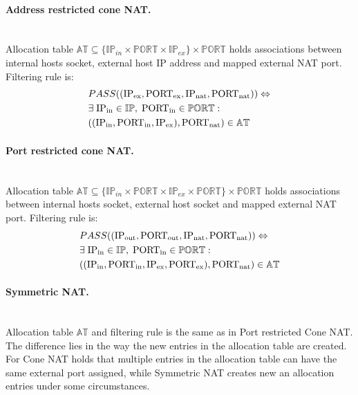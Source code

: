 \documentclass[twoside]{article}
\begin{document}
\begin{multicols}{2}
\paragraph{Address restricted cone NAT.} ~\\
Allocation table $\mathbb{AT} \subseteq \{\mathbb{IP}_{in} \times \mathbb{PORT} \times \mathbb{IP}_{ex}\} \times \mathbb{PORT}$ 
holds associations between internal hosts socket, external host IP address and mapped external NAT port. 
Filtering rule is:
\begin{align*}
& PASS((\text{IP\textsubscript{ex}}, \text{PORT\textsubscript{ex}}, \text{IP\textsubscript{nat}}, \text{PORT\textsubscript{nat}} )) \Leftrightarrow \\
&  \exists \; \text{IP\textsubscript{in}} \in \mathbb{IP}, \; \text{PORT\textsubscript{in}} \in \mathbb{PORT}:\\
& ((\text{IP\textsubscript{in}}, \text{PORT\textsubscript{in}}, \text{IP\textsubscript{ex}}), \text{PORT\textsubscript{nat}} ) \in \mathbb{AT}
\end{align*}

\paragraph{Port restricted cone NAT.} ~\\
Allocation table $\mathbb{AT} \subseteq \{\mathbb{IP}_{in} \times \mathbb{PORT} \times \mathbb{IP}_{ex} \times \mathbb{PORT}\} \times \mathbb{PORT}$ 
holds associations between internal hosts socket, external host socket and mapped external NAT port. 
Filtering rule is:
\begin{align*}
& PASS((\text{IP\textsubscript{out}}, \text{PORT\textsubscript{out}}, \text{IP\textsubscript{nat}}, \text{PORT\textsubscript{nat}} )) \Leftrightarrow \\
&  \exists \; \text{IP\textsubscript{in}} \in \mathbb{IP}, \; \text{PORT\textsubscript{in}} \in \mathbb{PORT}:\\
& ((\text{IP\textsubscript{in}}, \text{PORT\textsubscript{in}}, \text{IP\textsubscript{ex}}, \text{PORT\textsubscript{ex}}), \text{PORT\textsubscript{nat}} ) \in \mathbb{AT}
\end{align*}

\paragraph{Symmetric NAT.} ~\\
Allocation table $\mathbb{AT}$ and filtering rule is the same as in Port restricted Cone NAT. The difference lies in the way 
the new entries in the allocation table are created. For Cone NAT holds that multiple entries in the allocation table 
can have the same external port assigned, while Symmetric NAT creates new an allocation entries under some circumstances.


\end{multicols}
\end{document}
